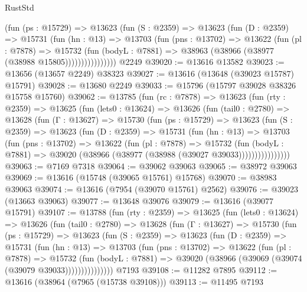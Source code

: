 \begin{lexlean}{RustStd}
\begin{coremodule}
                (fun (ps : @15729) =>
                @13623
                  (fun (S : @2359) =>
                  @13623
                    (fun (D : @2359) =>
                    @15731
                      (fun (hn : @13) =>
                      @13703
                        (fun (pns : @13702) =>
                        @13622
                          (fun (pl : @7878) =>
                          @15732
                            (fun (bodyL : @7881) =>
                            @38963 (@38966 (@38977 (@38988 @15805))))))))))))))))
    @2249
@39020 := @13616 @13582
@39023 := @13656 (@13657 @2249) @38323
@39027 := @13616 (@13648 (@39023 @15787) @15791)
@39028 := @13680 @2249
@39033 := @15796 (@15797 @39028 @38326 @15758 @15760)
@39062 := @13785
    (fun (rc : @7878) =>
    @13623
      (fun (rty : @2359) =>
      @13625
        (fun (lets0 : @13624) =>
        @13626
          (fun (tail0 : @2780) =>
          @13628
            (fun (Γ : @13627) =>
            @15730
              (fun (ps : @15729) =>
              @13623
                (fun (S : @2359) =>
                @13623
                  (fun (D : @2359) =>
                  @15731
                    (fun (hn : @13) =>
                    @13703
                      (fun (pns : @13702) =>
                      @13622
                        (fun (pl : @7878) =>
                        @15732
                          (fun (bodyL : @7881) =>
                          @39020 (@38966 (@38977 (@38988 (@39027 @39033))))))))))))))))
@39063 := @7169 @7318
@39064 := @39062 @39063
@39065 := @38972 @39063
@39069 := @13616 (@15748 (@39065 @15761) @15768)
@39070 := @38983 @39063
@39074 := @13616 (@7954 (@39070 @15761) @2562)
@39076 := @39023 (@13663 @39063)
@39077 := @13648 @39076
@39079 := @13616 (@39077 @15791)
@39107 := @13788
    (fun (rty : @2359) =>
    @13625
      (fun (lets0 : @13624) =>
      @13626
        (fun (tail0 : @2780) =>
        @13628
          (fun (Γ : @13627) =>
          @15730
            (fun (ps : @15729) =>
            @13623
              (fun (S : @2359) =>
              @13623
                (fun (D : @2359) =>
                @15731
                  (fun (hn : @13) =>
                  @13703
                    (fun (pns : @13702) =>
                    @13622
                      (fun (pl : @7878) =>
                      @15732
                        (fun (bodyL : @7881) =>
                        @39020 (@38966 (@39069 (@39074 (@39079 @39033)))))))))))))))
    @7193
@39108 := @11282 @7895
@39112 := @13616 (@38964 (@7965 (@15738 @39108)))
@39113 := @11495 @7193

\end{coremodule}
\end{lexlean}
